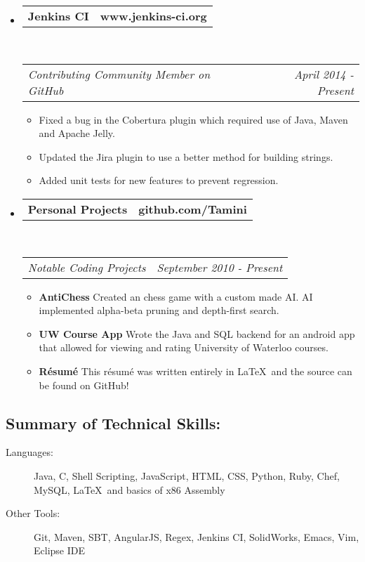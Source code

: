 \documentclass[11pt]{article} %
\makeatletter
\newcommand{\CPP}
{C\nolinebreak[4]\hspace{-.05em}\raisebox{.22ex}{\footnotesize\bf ++}}
\newcommand{\headerrow}[2]
{\begin{tabular*}{\linewidth}{l@{\extracolsep{\fill}}r}
	#1 &
	#2 \\
\end{tabular*}}
\makeatother
\begin{document}
\begin{itemize}[leftmargin=-0.5em, label={}]
	\item
	\headerrow
		{\textbf{Jenkins CI}}
		{\textbf{www.jenkins-ci.org}}
	\\
	\headerrow
		{\emph{Contributing Community Member on GitHub}}
		{\emph{April 2014 - Present}}
	\begin{itemize}
		\item Fixed a bug in the Cobertura plugin which required use of Java, Maven and Apache Jelly.
		\item Updated the Jira plugin to use a better method for building strings.
		\item Added unit tests for new features to prevent regression. 
	\end{itemize}

	\item
	\headerrow
		{\textbf{Personal Projects}}
		{\textbf{github.com/Tamini}}
	\\
	\headerrow
		{\emph{Notable Coding Projects}}
		{\emph{September 2010 - Present}}
	\begin{itemize}
		\item {\bf AntiChess} Created an chess game with a custom made AI. AI implemented alpha-beta pruning and depth-first search.
		\item {\bf UW Course App} Wrote the Java and SQL backend for an android app that allowed for viewing and rating University of Waterloo courses.
		\item {\bf R\'{e}sum\'{e}} This r\'{e}sum\'{e} was written entirely in \LaTeX\ and the source can be found on GitHub!
	\end{itemize}

\end{itemize}
\subsection*{Summary of Technical Skills:}
\begin{description}
	\item[Languages:] Java, \CPP, Shell Scripting, JavaScript, HTML, CSS, Python, Ruby, Chef, MySQL, \LaTeX\ and basics of x86 Assembly
	\item[Other Tools:] Git, Maven, SBT, AngularJS, Regex, Jenkins CI, SolidWorks, Emacs, Vim, Eclipse IDE
\end{description}
\end{document}
